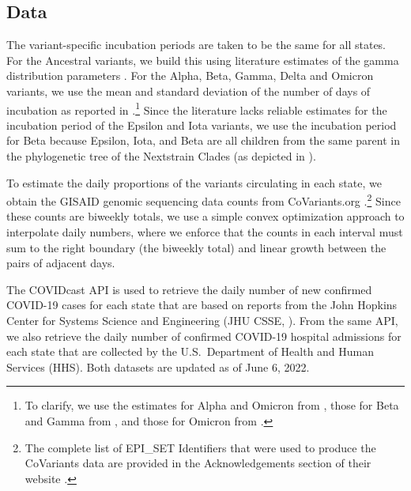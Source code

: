 \documentclass{article}
\begin{document}

\subsection{Data} 


The variant-specific incubation periods are taken to be the same for all states.
For the Ancestral variants, we build this using
literature estimates of the gamma distribution parameters \citep{tindale2020evidence}. 
For the Alpha, Beta, Gamma, Delta and Omicron variants, we use the
mean and standard deviation of the number of days of incubation as reported in
\citet{tanaka2022shorter, grant2022impact, ogata2022shorter}.\footnote{To clarify, 
we use the estimates for Alpha and Omicron from \citet{tanaka2022shorter}, those for
Beta and Gamma from \citet{grant2022impact}, and those for Omicron from
\citet{ogata2022shorter}.} Since the literature lacks reliable estimates for the incubation
period of the Epsilon and Iota variants, we use the
incubation period for Beta because Epsilon, Iota, and Beta are all
children from the same parent in the phylogenetic tree of the Nextstrain Clades
(as depicted in \citealp{hodcroft2021covariants}).

To estimate the daily proportions of the variants circulating in each state, we
obtain the GISAID genomic sequencing data counts from CoVariants.org
\citep{hodcroft2021covariants, elbe2017data}.\footnote{The complete list of
EPI\_SET Identifiers that were used to produce the CoVariants data are provided
in the Acknowledgements section of their website
\citep{hodcroft2021covariants}.} Since these counts are biweekly totals, we use
a simple convex optimization approach to interpolate daily numbers, where we
enforce that the counts in each interval must sum to the right boundary (the
biweekly total) and linear growth between the pairs of adjacent days. 

The COVIDcast API \citep{reinhart2021open} is used to retrieve the daily number
of new confirmed COVID-19 cases for each state that are based on reports from
the John Hopkins Center for Systems Science and Engineering (JHU CSSE,
\citealp{dong2020interactive}). From the same API, we also retrieve the daily
number of confirmed COVID-19 hospital admissions for each state that are
collected by the U.S.\ Department of Health and Human Services (HHS). Both
datasets are updated as of June 6, 2022.
\end{document}
